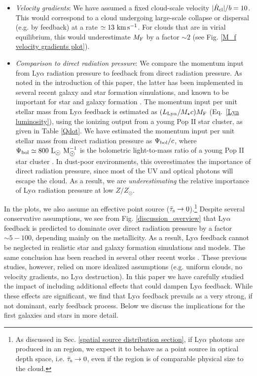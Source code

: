 \documentclass[fleqn,usenatbib]{mnras}
\newcommand\Msun{\text{M}_{\astrosun}} %
\newcommand\Lsun{\text{L}_{\astrosun}} %
\newcommand\HII{\ion{H}{II}\xspace} %
\begin{document}
\begin{itemize}
    \item \textit{Velocity gradients}: We have assumed a fixed cloud-scale velocity $\lvert \Dot{R}_{\rm cl} \rvert/b = 10$. This would correspond to a cloud undergoing large-scale collapse or dispersal (e.g. by feedback) at a rate $\simeq 13 ~ \rm km \, s^{-1}$. For clouds that are in virial equilibrium, this would underestimate $M_{\rm F}$ by a factor $\sim 2$ (see Fig. \ref{M_f velocity gradients plot}).
    
    \item \textit{Comparison to direct radiation pressure}: We compare the momentum input from Ly$\alpha$ radiation pressure to feedback from direct radiation pressure. As noted in the introduction of this paper, the latter has been implemented in several recent galaxy and star formation simulations, and known to be important for star and galaxy formation \citep[e.g.][]{Fall2010, Wise2012radpressure, Grudic2018, Hopkins2020}. The momentum input per unit stellar mass from Ly$\alpha$ feedback is estimated as $(L_{\rm Ly\alpha}/M_{\star}c) M_{\rm F}$ (Eq.~\ref{Lya luminosity}), using the ionizing output from a young Pop II star cluster, as given in Table \ref{Qdot}. We have estimated the momentum input per unit stellar mass from direct radiation pressure as $\Psi_{\rm bol}/c$, where $\Psi_{\rm bol} \simeq 800 ~ \Lsun ~ \Msun^{-1}$ is the bolometric light-to-mass ratio of a young Pop II star cluster \citep{Hopkins2023}. In dust-poor environments, this overestimates the importance of direct radiation pressure, since most of the UV and optical photons will escape the cloud. As a result, we are \textit{underestimating} the relative importance of Ly$\alpha$ radiation pressure at low $Z/Z_{\odot}$.
\end{itemize}
In the plots, we also assume an effective point source ($\Bar{\tau}_{\rm s} \rightarrow 0$).\footnote{As discussed in Sec. \ref{spatial source distribution section}, if Ly$\alpha$ photons are produced in an \HII region, we expect it to behave as a point source in optical depth space, i.e. $\Bar{\tau}_{\rm s} \rightarrow 0$, even if the \HII region is of comparable physical size to the cloud. } Despite several conservative assumptions, we see from Fig. \ref{discussion_overview} that Ly$\alpha$ feedback is predicted to dominate over direct radiation pressure by a factor $\sim 5 - 100$, depending mainly on the metallicity. As a result, Ly$\alpha$ feedback cannot be neglected in realistic star and galaxy formation simulations and models. The same conclusion has been reached in several other recent works \citep[][]{Smith2017, Abe2018, Kimm2018, Tomaselli2021, Nebrin2022, Kapoor2023, Thomson2024}. These previous studies, however, relied on more idealized assumptions (e.g. uniform clouds, no velocity gradients, no Ly$\alpha$ destruction). In this paper we have carefully studied the impact of including additional effects that could dampen Ly$\alpha$ feedback. While these effects are significant, we find that Ly$\alpha$ feedback prevails as a very strong, if not dominant, early feedback process. Below we discuss the implications for the first galaxies and stars in more detail. 
\end{document}

